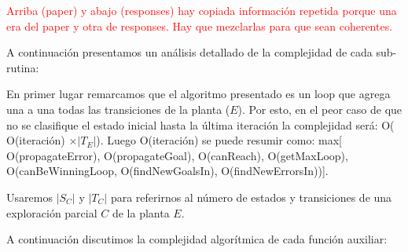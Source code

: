 \vspace{1cm}
\textcolor{red}{Arriba (paper) y abajo (responses) hay copiada información repetida porque una era del paper y otra de responses. Hay que mezclarlas para que sean coherentes.}
\vspace{1cm}

A continuación presentamos un análisis detallado de la complejidad de cada sub-rutina: 

En primer lugar remarcamos que el algoritmo presentado es un loop que agrega una a una todas las transiciones de la planta ($E$). Por esto, en el peor caso de que no se clasifique el estado inicial hasta la última iteración la complejidad será: O( O(iteración) $\times |T_{E}|$).
Luego O(iteración) se puede resumir como: max[ O(propagateError), O(propagateGoal), O(canReach), O(getMaxLoop),  
O(canBeWinningLoop, O(findNewGoalsIn),  O(findNewErrorsIn))]. 

Usaremos $|S_C|$ y $|T_C|$ para referirnos al número de estados y transiciones de una exploración parcial $C$ de la planta $E$.

A continuación discutimos la complejidad algorítmica de cada función auxiliar:

